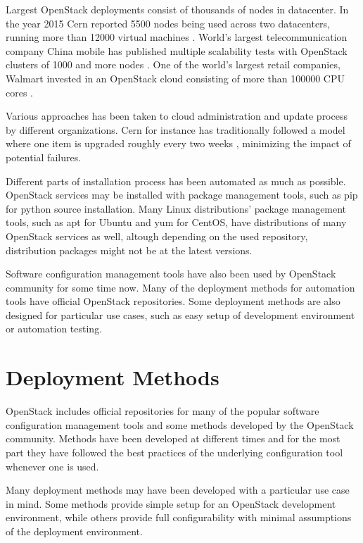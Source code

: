 \documentclass[officiallayout]{tktla}
\begin{document}
Largest OpenStack deployments consist of thousands of nodes in datacenter. In
the year 2015 Cern reported 5500 nodes being used across two datacenters,
running more than 12000 virtual machines \cite{cern}. World's largest
telecommunication company China mobile has published multiple scalability tests
with OpenStack clusters of 1000 and more nodes \cite{china-mobile}. One of the
world's largest retail companies, Walmart invested in an OpenStack cloud
consisting of more than 100000 CPU cores \cite{walmart}.

Various approaches has been taken to cloud administration and update process by
different organizations. Cern for instance has traditionally followed a model
where one item is upgraded roughly every two weeks \cite{cern}, minimizing the
impact of potential failures.

Different parts of installation process has been automated as much as possible.
OpenStack services may be installed with package management tools, such as pip
for python source installation. Many Linux distributions' package management
tools, such as apt for Ubuntu and yum for CentOS, have distributions of many
OpenStack services as well, altough depending on the used repository,
distribution packages might not be at the latest versions.

Software configuration management tools have also been used by OpenStack
community for some time now. Many of the deployment methods for automation
tools have official OpenStack repositories. Some deployment methods are also
designed for particular use cases, such as easy setup of development
environment or automation testing.

\section{Deployment Methods}

OpenStack includes official repositories for many of the popular software
configuration management tools and some methods developed by the OpenStack
community. Methods have been developed at different times and for the most part
they have followed the best practices of the underlying configuration tool
whenever one is used.

Many deployment methods may have been developed with a particular use case in
mind. Some methods provide simple setup for an OpenStack development
environment, while others provide full configurability with minimal assumptions
of the deployment environment.
\end{document}
